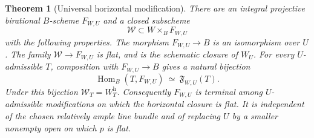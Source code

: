 \documentclass[11pt,reqno]{amsart}
\numberwithin{equation}{section}
\newtheorem{theorem}{Theorem}[section]
\theoremstyle{definition}\newtheorem{definition}[theorem]{Definition}
\theoremstyle{remark}\newtheorem{remark}[theorem]{Remark}
\begin{document}
\begin{theorem}[Universal horizontal modification]
\label{thm:horizontal-universal-v166}
There are an integral projective birational $B$-scheme $F_{W,U}$ and a
closed subscheme
\[
 \mathcal W\subset W\times_B F_{W,U}
\]
with the following properties. The morphism $F_{W,U}\to B$ is an
isomorphism over $U$. The family $\mathcal W\to F_{W,U}$ is flat,
and is the schematic closure of $W_U$. For every $U$-admissible $T$,
composition with $F_{W,U}\to B$ gives a natural bijection
\begin{equation}\label{eq:horizontal-universal-property-v166}
 \operatorname{Hom}_B(T,F_{W,U})\ \simeq\ \mathfrak F_{W,U}(T).
\end{equation}
Under this bijection $\mathcal W_T=W_T^{\mathrm h}$.
Consequently $F_{W,U}$ is terminal among $U$-admissible modifications
on which the horizontal closure is flat. It is independent of the
chosen relatively ample line bundle and of replacing $U$ by a smaller
nonempty open on which $p$ is flat.
\end{theorem}
\end{document}
